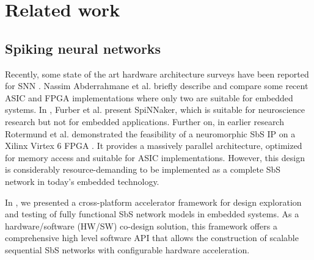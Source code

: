 \section{Related work}
\label{sec:related_work}
\subsection{Spiking neural networks}
Recently, some state of the art hardware architecture surveys have been reported for SNN \cite{Design_Exploration_SbS_Trans20, SNN_Survey_Trans19, zhang2018survey}. Nassim Abderrahmane et al. briefly describe and compare some recent ASIC and FPGA implementations where only two are suitable for embedded systems. In \cite{Spinnaker_Trans13}, Furber et al. present SpiNNaker, which is suitable for neuroscience research but not for embedded applications. Further on, in earlier research Rotermund et al. demonstrated the feasibility of a neuromorphic SbS IP on a Xilinx Virtex 6 FPGA \cite{rotermund2018massively}. It provides a massively parallel architecture, optimized for memory access and suitable for ASIC implementations. However, this design is considerably resource-demanding to be implemented as a complete SbS network in today's embedded technology.

In \cite{nevarez2020accelerator}, we presented a cross-platform accelerator framework for design exploration and testing of fully functional SbS network models in embedded systems. As a hardware/software (HW/SW) co-design solution, this framework offers a comprehensive high level software API that allows the construction of scalable sequential SbS networks with configurable hardware acceleration.

